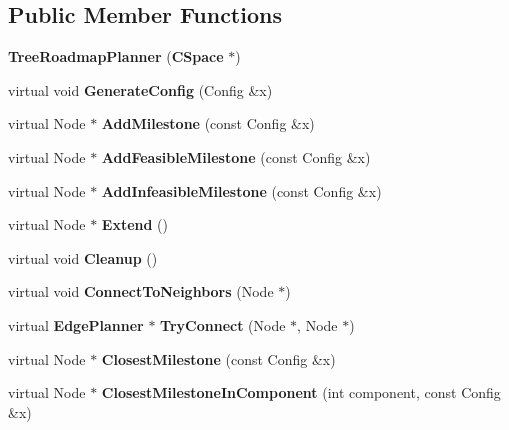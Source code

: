\subsection*{Public Member Functions}
\begin{DoxyCompactItemize}
\item 
{\bfseries Tree\+Roadmap\+Planner} ({\bf C\+Space} $\ast$)\label{classTreeRoadmapPlanner_a4a224cbd46b967627bf79020a8689ac1}

\item 
virtual void {\bfseries Generate\+Config} (Config \&x)\label{classTreeRoadmapPlanner_a0faebeade2d119af8cde3043283d375c}

\item 
virtual Node $\ast$ {\bfseries Add\+Milestone} (const Config \&x)\label{classTreeRoadmapPlanner_a7109b4f5ccba01f740a7f0e6ee8e3649}

\item 
virtual Node $\ast$ {\bfseries Add\+Feasible\+Milestone} (const Config \&x)\label{classTreeRoadmapPlanner_a8fa85aa4a97d7737a907870def10b767}

\item 
virtual Node $\ast$ {\bfseries Add\+Infeasible\+Milestone} (const Config \&x)\label{classTreeRoadmapPlanner_a25261ff00047ff40a9c80f74e2d877e7}

\item 
virtual Node $\ast$ {\bfseries Extend} ()\label{classTreeRoadmapPlanner_ad9c3c6d1d0767096a966ea3dac8bbbac}

\item 
virtual void {\bfseries Cleanup} ()\label{classTreeRoadmapPlanner_af3d85fd871852d0f5f0c08ff33d23f9c}

\item 
virtual void {\bfseries Connect\+To\+Neighbors} (Node $\ast$)\label{classTreeRoadmapPlanner_ade53159d1bd7e9625e55c723eeb74a5e}

\item 
virtual {\bf Edge\+Planner} $\ast$ {\bfseries Try\+Connect} (Node $\ast$, Node $\ast$)\label{classTreeRoadmapPlanner_a2d751322db677629e241652c54354bfa}

\item 
virtual Node $\ast$ {\bfseries Closest\+Milestone} (const Config \&x)\label{classTreeRoadmapPlanner_a674d861ad4b93a79ee78cb89fb45cf64}

\item 
virtual Node $\ast$ {\bfseries Closest\+Milestone\+In\+Component} (int component, const Config \&x)\label{classTreeRoadmapPlanner_a423c21dd97c0ef8bd3f63f18e1e65ab0}


\end{DoxyCompactItemize}

